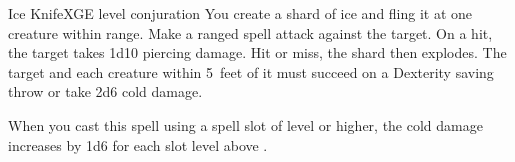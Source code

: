 \begin{spell}{Ice Knife}{XGE}{ level conjuration}
{
}
You create a shard of ice and fling it at one creature
within range. Make a ranged spell attack against the target.
On a hit, the target takes 1d10 piercing damage. Hit
or miss, the shard then explodes. The target and each
creature within 5~feet of it must succeed on a Dexterity
saving throw or take 2d6 cold damage.

 When you cast this spell using a
spell slot of  level or higher, the cold damage increases
by 1d6 for each slot level above .
\end{spell}
